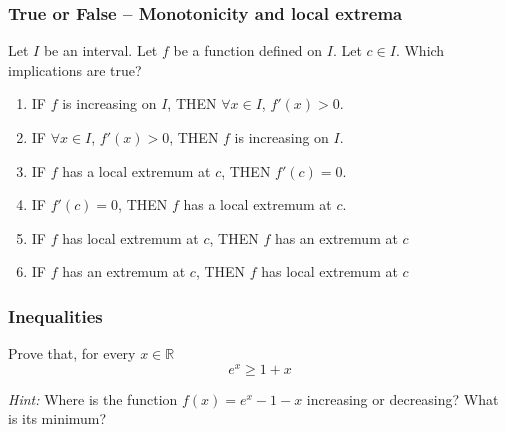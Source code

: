 \documentclass[14pt]{beamer}
\begin{document}

	\begin{frame}[t]
		\fontsize{13}{13}\selectfont
		\frametitle{True or False -- Monotonicity and local extrema}

		Let $I$ be an interval. Let $f$ be a function defined on $I$. Let $c \in I$.
		Which implications are true?

		\begin{enumerate}
			\item IF {\color{red} $f$ is increasing on $I$}, \quad THEN
				{\color{blue} $\forall x \in I$, $f'(x) >0$}.

			\item IF {\color{blue} $\forall x \in I$, $f'(x) >0$}, \quad THEN
				{\color{red} $f$ is increasing on $I$}.

			\item IF {\color{rosa} $f$ has a local extremum at $c$}, \quad THEN
				{\color{naranja} $f'(c)=0$}.

			\item IF {\color{naranja} $f'(c)=0$}, \quad THEN
				{\color{rosa} $f$ has a local extremum at $c$}.

			\item IF {\color{rosa} $f$ has local extremum at $c$}, \; THEN
				{\color{verde} $f$ has an extremum at $c$}

			\item IF {\color{verde} $f$ has an extremum at $c$}, \; THEN
				{\color{rosa} $f$ has local extremum at $c$}
		\end{enumerate}
	\end{frame}


	\begin{frame}[t]
		\frametitle{Inequalities}

		Prove that, for every $x \in \mathbb{R}$
		\[
			e^{x}\geq 1 + x
		\]

		\emph{Hint:} Where is the function $\displaystyle f(x) =e^{x}- 1-x$ increasing
		or decreasing? What is its minimum?
	\end{frame}

\end{document}

